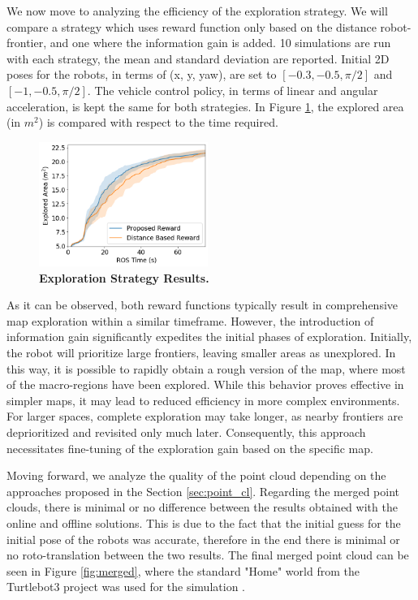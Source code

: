 We now move to analyzing the efficiency of the exploration strategy. We will compare a strategy which uses reward function only based on the distance robot-frontier, and one where the information gain is added.
10 simulations are run with each strategy, the mean and standard deviation are reported. Initial 2D poses for the robots, in terms of (x, y, yaw), are set to $[-0.3, -0.5, \pi/2]$ and $[-1, -0.5, \pi/2]$. The vehicle control policy, in terms of linear and angular acceleration, is kept the same for both strategies.
In Figure \ref{fig:results}, the explored area (in $m^2$) is compared with respect to the time required.
\begin{figure}[b]
  \begin{center}
    \includegraphics[width=0.49\textwidth]{img/mapping_speed.png}
  \end{center}
  \caption[]{
    \textbf{Exploration Strategy Results.} 
  }
  \label{fig:results}
\end{figure}
As it can be observed, both reward functions typically result in comprehensive map exploration within a similar timeframe. However, the introduction of information gain significantly expedites the initial phases of exploration. Initially, the robot will prioritize large frontiers, leaving smaller areas as unexplored. In this way, it is possible to rapidly obtain a rough version of the map, where most of the macro-regions have been explored. While this behavior proves effective in simpler maps, it may lead to reduced efficiency in more complex environments. For larger spaces, complete exploration may take longer, as nearby frontiers are deprioritized and revisited only much later. Consequently, this approach necessitates fine-tuning of the exploration gain based on the specific map.

Moving forward, we analyze the quality of the point cloud depending on the approaches proposed in the Section \ref{sec:point_cl}.
Regarding the merged point clouds, there is minimal or no difference between the results obtained with the online and offline solutions. This is due to the fact that the initial guess for the initial pose of the robots was accurate, therefore in the end there is minimal or no roto-translation between the two results. The final merged point cloud can be seen in Figure \ref{fig:merged}, where the standard "Home" world from the Turtlebot3 project was used for the simulation \cite{turtlebot3-simulation}. 

